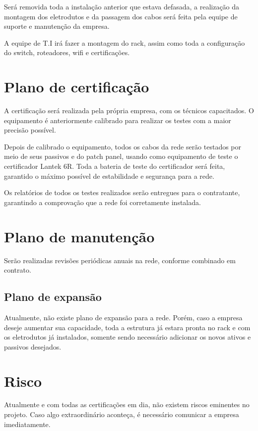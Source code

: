 \documentclass[	DIV=calc,%
							paper=a4,%
							fontsize=12pt,%
							onecolumn]{scrartcl}	 					%
\begin{document}
Será removida toda a instalação anterior que estava defasada, a realização da montagem dos eletrodutos e da passagem dos cabos será feita pela equipe de suporte e manutenção da empresa.

A equipe de T.I irá fazer a montagem do rack, assim como toda a configuração do switch, roteadores, wifi e certificações.

\section{Plano de certificação}

A certificação será realizada pela própria empresa, com os técnicos capacitados. O equipamento é anteriormente calibrado para realizar os testes com a maior precisão possível.

Depois de calibrado o equipamento, todos os cabos da rede serão testados por meio de seus passivos e do patch panel, usando como equipamento de teste o certificador Lantek 6R. Toda a bateria de teste do certificador será feita, garantido o máximo possível de estabilidade e segurança para a rede.

Os relatórios de todos os testes realizados serão entregues para o contratante, garantindo a comprovação que a rede foi corretamente instalada.

\section{Plano de manutenção}

Serão realizadas revisões periódicas anuais na rede, conforme combinado em contrato.

\subsection{Plano de expansão}

Atualmente, não existe plano de expansão para a rede. Porém, caso a empresa deseje aumentar sua capacidade, toda a estrutura já estara pronta no rack e com os eletrodutos já instalados, somente sendo necessário adicionar os novos ativos e passivos desejados.

\section{Risco}
Atualmente e com todas as certificações em dia, não existem riscos eminentes no projeto. Caso algo extraordinário aconteça, é necessário comunicar a empresa imediatamente.
\end{document}
